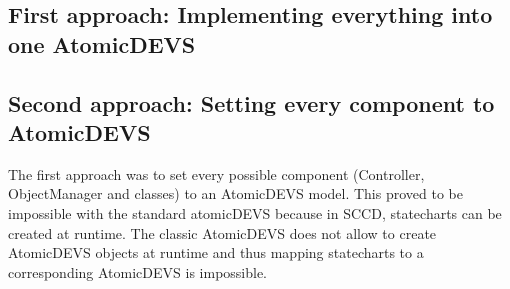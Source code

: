 \subsection{First approach: Implementing everything into one AtomicDEVS}

\subsection{Second approach: Setting every component to AtomicDEVS}

The first approach was to set every possible component (Controller, ObjectManager and classes) to an AtomicDEVS model. This proved to be impossible with the standard
atomicDEVS because in SCCD, statecharts can be created at runtime. The classic AtomicDEVS does not allow to create AtomicDEVS objects at runtime and thus mapping statecharts
to a corresponding AtomicDEVS is impossible.


